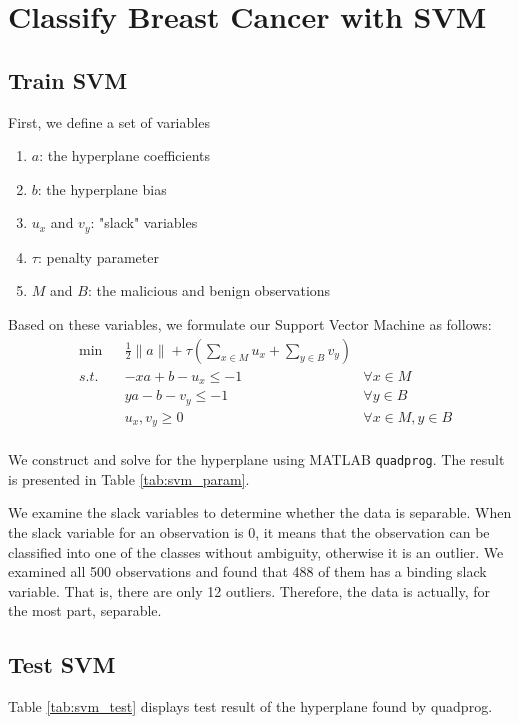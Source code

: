  



\section{Classify Breast Cancer with SVM}
\subsection{Train SVM}
First, we define a set of variables
\begin{enumerate}
    \item $a$: the hyperplane coefficients
    \item $b$: the hyperplane bias
    \item $u_x$ and $v_y$: "slack" variables
    \item $\tau$: penalty parameter
    \item $M$ and $B$: the malicious and benign observations
\end{enumerate}
Based on these variables, we formulate our Support Vector Machine as follows: 
\begin{align*}
&\min&& \frac{1}{2}\|a\| + \tau(\sum_{x\in M} u_x + \sum_{y \in B} v_y)\\
&s.t.&& -xa + b - u_x \leq -1 & \forall x \in M \\
&&& ya - b - v_y \leq -1 & \forall y \in B \\
&&& u_x, v_y \geq 0 &\forall x \in M, y \in B\\
\end{align*}

We construct and solve for the hyperplane using MATLAB \texttt{quadprog}. The result is presented in Table \ref{tab:svm_param}.

We examine the slack variables to determine whether the data is separable. When the slack variable for an observation is 0, it means that the observation can be classified into one of the classes without ambiguity, otherwise it is an outlier. We examined all 500 observations and found that 488 of them has a binding slack variable. That is, there are only 12 outliers. Therefore, the data is actually, for the most part, separable. 



\subsection{Test SVM}
Table \ref{tab:svm_test} displays test result of the hyperplane found by quadprog.

